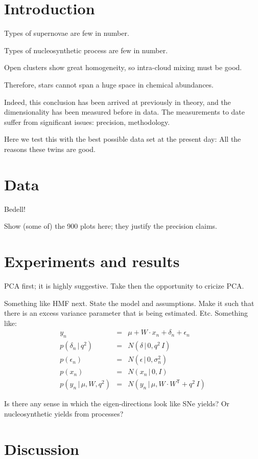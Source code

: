 \documentclass[12pt]{article}
\newcommand{\given}{\,|\,}
\newcommand{\trans}[1]{{#1}^{\!\mathsf{T}}}
\begin{document}
\section{Introduction}

Types of supernovae are few in number.

Types of nucleosynthetic process are few in number.

Open clusters show great homogeneity, so intra-cloud mixing must be good.

Therefore, stars cannot span a huge space in chemical abundances.

Indeed, this conclusion has been arrived at previously in theory, and
the dimensionality has been measured before in data. The measurements to
date suffer from significant issues: precision, methodology.

Here we test this with the best possible data set at the present day:
All the reasons these twins are good.

\section{Data}

Bedell!

Show (some of) the 900 plots here; they justify the precision claims.

\section{Experiments and results}

PCA first; it is highly suggestive. Take then the opportunity to cricize PCA.

Something like HMF next. State the model and assumptions. Make it such that
there is an excess variance parameter that is being estimated. Etc.
Something like:
\begin{eqnarray}
y_n &=& \mu + W\cdot x_n + \delta_n + \epsilon_n
\\
p(\delta_n\given q^2) &=& N(\delta\given 0, q^2\,I)
\\
p(\epsilon_n) &=& N(\epsilon\given 0, \sigma_n^2)
\\
p(x_n) &=& N(x_n\given 0, I)
\\
p(y_n\given \mu,W,q^2) &=& N(y_n\given \mu, W\cdot\trans{W}+q^2\,I)
\end{eqnarray}

Is there any sense in which the eigen-directions look like SNe yields?
Or nucleosynthetic yields from processes?

\section{Discussion}
\end{document}
